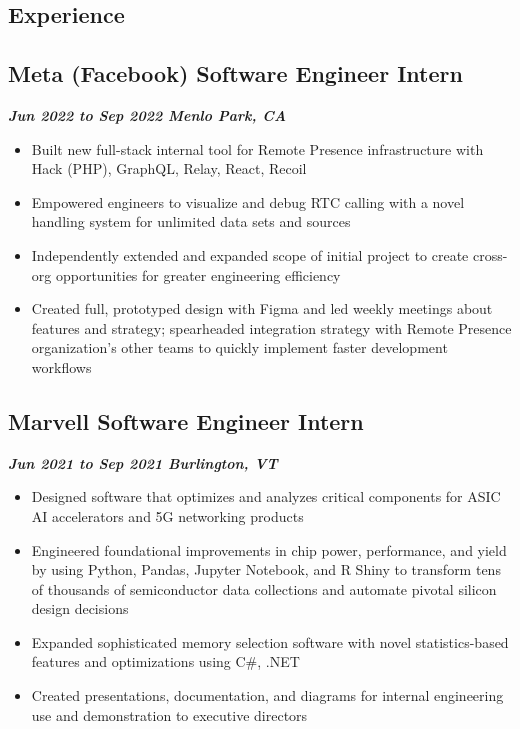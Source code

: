 \documentclass[10pt]{article}
\begin{document}
\begin{raggedright}
    \section*{Experience}

	    \subsection*{\textbf{\large{Meta (Facebook) \textendash{} Software Engineer Intern}}} \hfill \textbf{\textit{Jun 2022 to Sep 2022 \textendash{} Menlo Park, CA}}
        \begin{itemize}
            \item Built new full-stack internal tool for Remote Presence infrastructure with Hack (PHP), GraphQL, Relay, React, Recoil
            \item Empowered engineers to visualize and debug RTC calling with a novel handling system for unlimited data sets and sources
            \item Independently extended and expanded scope of initial project to create cross-org opportunities for greater engineering efficiency
            \item Created full, prototyped design with Figma and led weekly meetings about features and strategy; spearheaded integration strategy with Remote Presence organization's other teams to quickly implement faster development workflows
        \end{itemize}

        \subsection*{\textbf{\large{Marvell \textendash{} Software Engineer Intern}}} \hfill \textbf{\textit{Jun 2021 to Sep 2021 \textendash{} Burlington, VT}}
        \begin{itemize}
            \item Designed software that optimizes and analyzes critical components for ASIC AI accelerators and 5G networking products
            \item Engineered foundational improvements in chip power, performance, and yield by using Python, Pandas, Jupyter Notebook, and R Shiny to transform tens of thousands of semiconductor data collections and automate pivotal silicon design decisions
            \item Expanded sophisticated memory selection software with novel statistics-based features and optimizations using C\#, .NET
            \item Created presentations, documentation, and diagrams for internal engineering use and demonstration to executive directors
        \end{itemize}


\end{raggedright}
\end{document}
